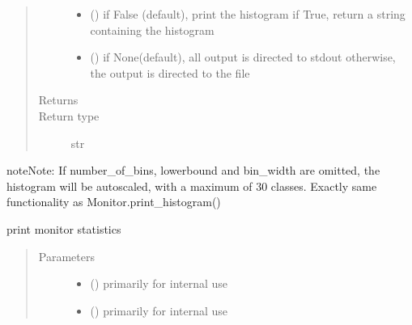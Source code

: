 \documentclass[letterpaper,10pt,english]{sphinxmanual}
\begin{document}
\begin{fulllineitems}
\begin{fulllineitems}
\begin{quote}
\begin{description}
\begin{itemize}
\item {} 
 () \textendash{} if False (default), print the histogram
if True, return a string containing the histogram

\item {} 
 () \textendash{} if None(default), all output is directed to stdout 
otherwise, the output is directed to the file

\end{itemize}

\item[{Returns}] \leavevmode
{}

\item[{Return type}] \leavevmode
str

\end{description}\end{quote}

\begin{sphinxadmonition}{note}{Note:}
If number\_of\_bins, lowerbound and bin\_width are omitted, the histogram will be autoscaled,
with a maximum of 30 classes. 
Exactly same functionality as Monitor.print\_histogram()
\end{sphinxadmonition}

\end{fulllineitems}


\begin{fulllineitems}
\label{\detokenize{Reference:salabim.Monitor.print_statistics}}
print monitor statistics
\begin{quote}\begin{description}
\item[{Parameters}] \leavevmode\begin{itemize}
\item {} 
 () \textendash{} primarily for internal use

\item {} 
 () \textendash{} primarily for internal use


\end{itemize}
\end{description}
\end{quote}
\end{fulllineitems}
\end{fulllineitems}
\end{document}
